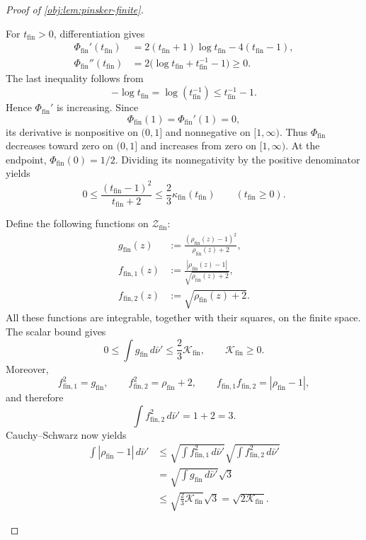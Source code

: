 \documentclass[11pt]{article}
\begin{document}
\begin{proof}[Proof of \cref{obj:lem:pinsker-finite}]
\begin{enumerate}
For \(t_{\mathrm{fin}}>0\), differentiation gives
\[
\begin{aligned}
\Phi_{\mathrm{fin}}'(t_{\mathrm{fin}})
&=2(t_{\mathrm{fin}}+1)\log t_{\mathrm{fin}}
  -4(t_{\mathrm{fin}}-1),\\
\Phi_{\mathrm{fin}}''(t_{\mathrm{fin}})
&=2\bigl(\log t_{\mathrm{fin}}+t_{\mathrm{fin}}^{-1}-1\bigr)
\ge0.
\end{aligned}
\]
The last inequality follows from
\[
-\log t_{\mathrm{fin}}
=\log(t_{\mathrm{fin}}^{-1})
\le t_{\mathrm{fin}}^{-1}-1.
\]
Hence \(\Phi_{\mathrm{fin}}'\) is increasing. Since
\[
\Phi_{\mathrm{fin}}(1)=\Phi_{\mathrm{fin}}'(1)=0,
\]
its derivative is nonpositive on \((0,1]\) and nonnegative on
\([1,\infty)\). Thus \(\Phi_{\mathrm{fin}}\) decreases toward zero on
\((0,1]\) and increases from zero on \([1,\infty)\). At the endpoint,
\(\Phi_{\mathrm{fin}}(0)=1/2\). Dividing its nonnegativity by the positive denominator yields
\[
0\le
\frac{(t_{\mathrm{fin}}-1)^2}{t_{\mathrm{fin}}+2}
\le\frac23\kappa_{\mathrm{fin}}(t_{\mathrm{fin}})
\qquad(t_{\mathrm{fin}}\ge0).
\]

Define the following functions on \(\mathcal Z_{\mathrm{fin}}\):
\[
\begin{aligned}
g_{\mathrm{fin}}(z)
&:=\frac{(\rho_{\mathrm{fin}}(z)-1)^2}{\rho_{\mathrm{fin}}(z)+2},\\
f_{\mathrm{fin},1}(z)
&:=\frac{|\rho_{\mathrm{fin}}(z)-1|}
        {\sqrt{\rho_{\mathrm{fin}}(z)+2}},\\
f_{\mathrm{fin},2}(z)
&:=\sqrt{\rho_{\mathrm{fin}}(z)+2}.
\end{aligned}
\]
All these functions are integrable, together with their squares, on the finite space. The scalar bound gives
\[
0\le\int g_{\mathrm{fin}}\,d\bar\nu'
\le\frac23\mathcal K_{\mathrm{fin}},
\qquad
\mathcal K_{\mathrm{fin}}\ge0.
\]
Moreover,
\[
f_{\mathrm{fin},1}^2=g_{\mathrm{fin}},
\qquad
f_{\mathrm{fin},2}^2=\rho_{\mathrm{fin}}+2,
\qquad
f_{\mathrm{fin},1}f_{\mathrm{fin},2}
=|\rho_{\mathrm{fin}}-1|,
\]
and therefore
\[
\int f_{\mathrm{fin},2}^2\,d\bar\nu'=1+2=3.
\]
Cauchy--Schwarz now yields
\[
\begin{aligned}
\int|\rho_{\mathrm{fin}}-1|\,d\bar\nu'
&\le
\sqrt{\int f_{\mathrm{fin},1}^2\,d\bar\nu'}
\sqrt{\int f_{\mathrm{fin},2}^2\,d\bar\nu'}\\
&=\sqrt{\int g_{\mathrm{fin}}\,d\bar\nu'}\sqrt3\\
&\le\sqrt{\frac23\mathcal K_{\mathrm{fin}}}\sqrt3
=\sqrt{2\mathcal K_{\mathrm{fin}}}.
\end{aligned}
\]


\end{enumerate}
\end{proof}
\end{document}
